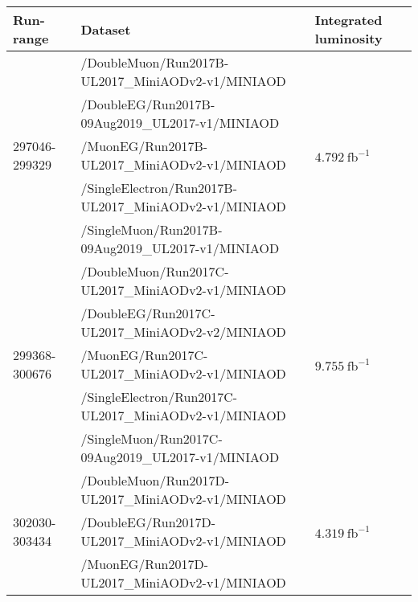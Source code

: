 \begin{table}[h]
\scriptsize
    \centering
    \begin{tabular}{|l|l|l|} 
\hline %
\hline %
Run-range & Dataset & Integrated luminosity \\
\hline %
\hline %
\multirow{5}{*}{297046-299329} & /DoubleMuon/Run2017B-UL2017\_MiniAODv2-v1/MINIAOD &  \multirow{5}{*}{$4.792\ \text{fb}^{-1}$} \\ 
& /DoubleEG/Run2017B-09Aug2019\_UL2017-v1/MINIAOD &  \\ 
& /MuonEG/Run2017B-UL2017\_MiniAODv2-v1/MINIAOD &  \\ 
& /SingleElectron/Run2017B-UL2017\_MiniAODv2-v1/MINIAOD &  \\ 
& /SingleMuon/Run2017B-09Aug2019\_UL2017-v1/MINIAOD &  \\ 
\hline
\multirow{5}{*}{299368-300676} & /DoubleMuon/Run2017C-UL2017\_MiniAODv2-v1/MINIAOD &  \multirow{5}{*}{$9.755\ \text{fb}^{-1}$}  \\ 
& /DoubleEG/Run2017C-UL2017\_MiniAODv2-v2/MINIAOD &  \\ 
& /MuonEG/Run2017C-UL2017\_MiniAODv2-v1/MINIAOD &  \\ 
& /SingleElectron/Run2017C-UL2017\_MiniAODv2-v1/MINIAOD &  \\ 
& /SingleMuon/Run2017C-09Aug2019\_UL2017-v1/MINIAOD &  \\ 
\hline
\multirow{5}{*}{302030-303434} & /DoubleMuon/Run2017D-UL2017\_MiniAODv2-v1/MINIAOD &  \multirow{5}{*}{$4.319\ \text{fb}^{-1}$} \\ 
& /DoubleEG/Run2017D-UL2017\_MiniAODv2-v1/MINIAOD &  \\ 
& /MuonEG/Run2017D-UL2017\_MiniAODv2-v1/MINIAOD &  \\ 

\end{tabular}
\end{table}
